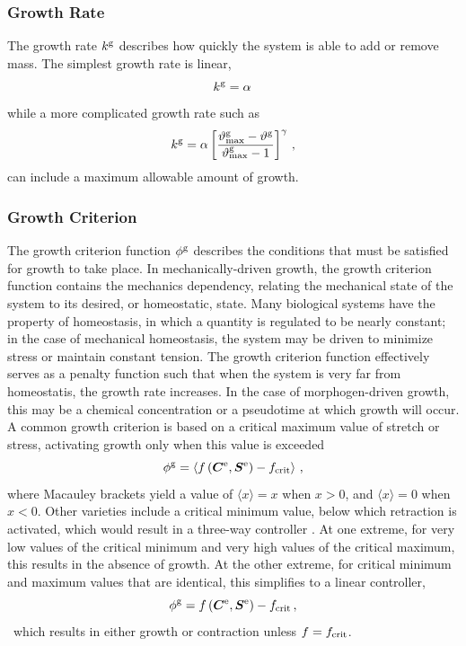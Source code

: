 \documentclass[10pt,letterpaper,oneside]{report}
\newcommand{\ten}[1]{\mbox{\boldmath $#1$}{}}
\newcommand{\scas}[1]{\mbox{{\scriptsize{${\rm{#1}}$}}}{}}
\begin{document}
\begin{itemize}
\subsubsection{Growth Rate}
\label{subsec:rate}
The growth rate $k^{\scas{g}}$ describes how quickly the system is able to add or remove mass.  The simplest growth rate is linear, 
\begin{equation}
k^{\scas{g}} = \alpha \, 
\end{equation}
while a more complicated growth rate such as 
\begin{equation}
k^{\scas{g}} = \alpha \left[ \frac{ \vartheta^{\scas{g}}_{\scas{max}} - \vartheta^{\scas{g}} }{ \vartheta^{\scas{g}}_{\scas{max}} - 1} \right]^{\gamma} \, ,  
\end{equation}
can include a maximum allowable amount of growth.


\subsubsection{Growth Criterion}
\label{subsec:crit}
The growth criterion function $\phi^{\scas{g}}$ describes the conditions that must be satisfied for growth to take place.  
In mechanically-driven growth, the growth criterion function contains the mechanics dependency, relating the mechanical state of the system to its desired, or homeostatic, state.  Many biological systems have the property of homeostasis, in which a quantity is regulated to be nearly constant; in the case of mechanical homeostasis, the system may be driven to minimize stress or maintain constant tension.  The growth criterion function effectively serves as a penalty function such that when the system is very far from homeostatis, the growth rate increases.  
In the case of morphogen-driven growth, this may be a chemical concentration or a pseudotime at which growth will occur.  
A common growth criterion is based on a critical maximum value of stretch or stress, activating growth only when this value is exceeded
\begin{equation}
\phi^{\scas{g}} = \left\langle f \left( \ten{C}^{\scas{e}}, \ten{S}^{\scas{e}} \right) - f_{\scas{crit}} \right\rangle \, ,
\end{equation}
where Macauley brackets yield a value of $ \langle x \rangle = x $ when $ x > 0$, and $ \langle x \rangle = 0 $ when $ x < 0$.  
Other varieties include a critical minimum value, below which retraction is activated, which would result in a three-way controller \cite{Dennerll1989}.  At one extreme, for very low values of the critical minimum and very high values of the critical maximum, this results in the absence of growth.  At the other extreme, for critical minimum and maximum values that are identical, this simplifies to a linear controller, 
\begin{equation}
\phi^{\scas{g}} = f \left( \ten{C}^{\scas{e}}, \ten{S}^{\scas{e}} \right) - f_{\scas{crit}} \, ,
\end{equation}\
which results in either growth or contraction unless $f = f_{\scas{crit}}$.



\end{itemize}
\end{document}
